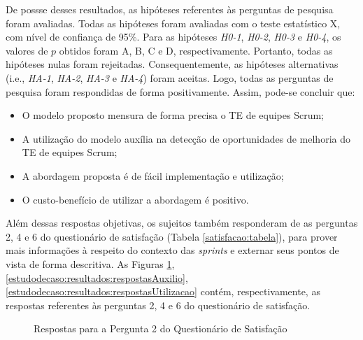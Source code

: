 De possse desses resultados, as hipóteses referentes às perguntas de pesquisa foram avaliadas. Todas as hipóteses foram avaliadas com o teste estatístico X, com nível de confiança de 95\%. Para as hipóteses \textit{H0-1}, \textit{H0-2}, \textit{H0-3} e \textit{H0-4}, os valores de $p$ obtidos foram A, B, C e D, respectivamente. Portanto, todas as hipóteses nulas foram rejeitadas. Consequentemente, as hipóteses alternativas (i.e., \textit{HA-1}, \textit{HA-2}, \textit{HA-3} e \textit{HA-4}) foram aceitas. Logo, todas as perguntas de pesquisa foram respondidas de forma positivamente. Assim, pode-se concluir que:

\begin{itemize}
  \item O modelo proposto mensura de forma precisa o TE de equipes Scrum;
  \item A utilização do modelo auxília na detecção de oportunidades de melhoria do TE de equipes Scrum;
  \item A abordagem proposta é de fácil implementação e utilização;
  \item O custo-benefício de utilizar a abordagem é positivo.
\end{itemize}

Além dessas respostas objetivas, os sujeitos também responderam de as perguntas 2, 4 e 6 do questionário de satisfação (Tabela \ref{satisfacao:tabela}), para prover mais informações à respeito do contexto das \textit{sprints} e externar seus pontos de vista de forma descritiva. As Figuras \ref{estudodecaso:resultados:respostasFidelidade}, \ref{estudodecaso:resultados:respostasAuxilio}, \ref{estudodecaso:resultados:respostasUtilizacao} contém, respectivamente, as respostas referentes às perguntas 2, 4 e 6 do questionário de satisfação.

\begin{figure}[ht!]
\begin{center}
	\end{center}
	\caption{Respostas para a Pergunta 2 do Questionário de Satisfação}
	\label{estudodecaso:resultados:respostasFidelidade}
\end{figure}

